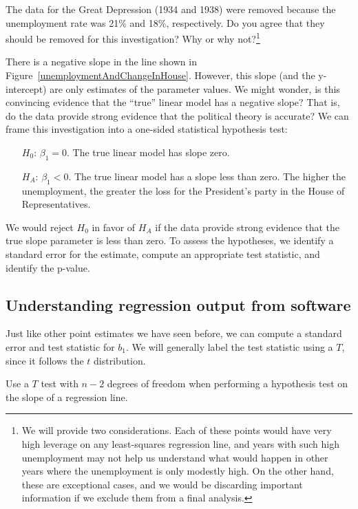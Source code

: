 \begin{exercise}
The data for the Great Depression (1934 and 1938) were removed because the unemployment rate was 21\% and 18\%, respectively. Do you agree that they should be removed for this investigation? Why or why not?\footnote{We will provide two considerations. Each of these points would have very high leverage on any least-squares regression line, and years with such high unemployment may not help us understand what would happen in other years where the unemployment is only modestly high. On the other hand, these are exceptional cases, and we would be discarding important information if we exclude them from a final analysis.}
\end{exercise}

There is a negative slope in the line shown in Figure~\ref{unemploymentAndChangeInHouse}. However, this slope (and the y-intercept) are only estimates of the parameter values. We might wonder, is this convincing evidence that the ``true'' linear model has a negative slope? That is, do the data provide strong evidence that the political theory is accurate? We can frame this investigation into a one-sided statistical hypothesis test:
\begin{itemize}
\item[$H_0$:] $\beta_1 = 0$. The true linear model has slope zero.
\item[$H_A$:] $\beta_1 < 0$. The true linear model has a slope less than zero. The higher the unemployment, the greater the loss for the President's party in the House of Representatives.
\end{itemize}
We would reject $H_0$ in favor of $H_A$ if the data provide strong evidence that the true slope parameter is less than zero. To assess the hypotheses, we identify a standard error for the estimate, compute an appropriate test statistic, and identify the p-value.


\subsection{Understanding regression output from software}
\label{testStatisticForTheSlope}

Just like other point estimates we have seen before, we can compute a standard error and test statistic for $b_1$. We will generally label the test statistic using a $T$, since it follows the $t$ distribution.

\begin{tipBox}{
Use a $T$ test with $n - 2$ degrees of freedom when performing a hypothesis test on the slope of a regression line.}
\end{tipBox}


